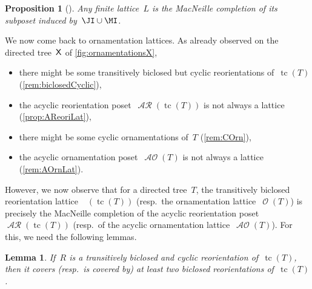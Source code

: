 \documentclass{amsart}
\newtheorem{proposition}[theorem]{Proposition}
\newtheorem{lemma}[theorem]{Lemma}
\theoremstyle{definition}
\renewcommand{\c}[1]{\mathcal{#1}} %
\DeclareMathOperator{\tc}{tc} %
\DeclareMathOperator{\Orn}{\c{O}}  %
\DeclareMathOperator{\AOrn}{\c{AO}}  %
\DeclareMathOperator{\AReori}{\c{AR}}  %
\DeclareMathOperator{\Rbi}{\c{R}^{bi}}  %
\newcommand{\Xgraph}{\sf X} %
\begin{document}
\begin{proposition}[{\cite[Thm.~7.42]{DaveyPriestley}}]
\label{prop:MacNeilleCompletion}
Any finite lattice~$L$ is the MacNeille completion of its subposet induced by~$\JI \cup \MI$.
\end{proposition}

We now come back to ornamentation lattices.
As already observed on the directed tree~$\Xgraph$ of \cref{fig:ornamentationsX},
\begin{itemize}
\item there might be some transitively biclosed but cyclic reorientations of~$\tc(T)$ (\cref{rem:biclosedCyclic}),
\item the acyclic reorientation poset~$\AReori(\tc(T))$ is not always a lattice (\cref{prop:AReoriLat}),
\item there might be some cyclic ornamentations of~$T$ (\cref{rem:COrn}),
\item the acyclic ornamentation poset~$\AOrn(T)$ is not always a lattice (\cref{rem:AOrnLat}).
\end{itemize}
However, we now observe that for a directed tree~$T$, the transitively biclosed reorientation lattice~$\Rbi(\tc(T))$ (resp.~the ornamentation lattice~$\Orn(T)$) is precisely the MacNeille completion of the acyclic reorientation poset~$\AReori(\tc(T))$ (resp.~of the acyclic ornamentation lattice~$\AOrn(T)$).
For this, we need the following lemmas.

\begin{lemma}
\label{lem:irreduciblesReorientationsAcyclicT}
If~$R$ is a transitively biclosed and cyclic reorientation of~$\tc(T)$, then it covers (resp.~is covered by) at least two biclosed reorientations of~$\tc(T)$.
\end{lemma}
\end{document}
